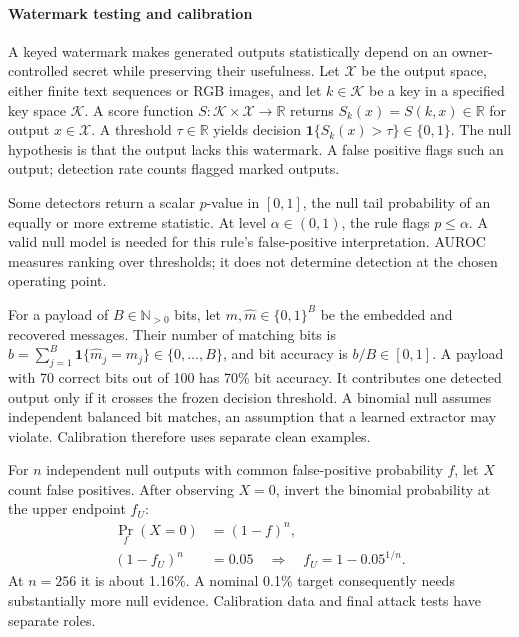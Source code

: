 \paragraph{Watermark testing and calibration}
A keyed watermark makes generated outputs statistically depend on an owner-controlled secret while preserving their usefulness. Let $\mathcal X$ be the output space, either finite text sequences or RGB images, and let $k\in\mathcal K$ be a key in a specified key space $\mathcal K$. A score function $S:\mathcal K\times\mathcal X\to\mathbb R$ returns $S_k(x)=S(k,x)\in\mathbb R$ for output $x\in\mathcal X$. A threshold $\tau\in\mathbb R$ yields decision $\mathbf1\{S_k(x)>\tau\}\in\{0,1\}$. The null hypothesis is that the output lacks this watermark. A false positive flags such an output; detection rate counts flagged marked outputs.

Some detectors return a scalar $p$-value in $[0,1]$, the null tail probability of an equally or more extreme statistic. At level $\alpha\in(0,1)$, the rule flags $p\leq\alpha$. A valid null model is needed for this rule's false-positive interpretation. AUROC measures ranking over thresholds; it does not determine detection at the chosen operating point.

For a payload of $B\in\mathbb N_{>0}$ bits, let $m,\widehat m\in\{0,1\}^B$ be the embedded and recovered messages. Their number of matching bits is $b=\sum_{j=1}^B\mathbf1\{\widehat m_j=m_j\}\in\{0,\ldots,B\}$, and bit accuracy is $b/B\in[0,1]$. A payload with 70 correct bits out of 100 has 70\% bit accuracy. It contributes one detected output only if it crosses the frozen decision threshold. A binomial null assumes independent balanced bit matches, an assumption that a learned extractor may violate. Calibration therefore uses separate clean examples.

For $n$ independent null outputs with common false-positive probability $f$, let $X$ count false positives. After observing $X=0$, invert the binomial probability at the upper endpoint $f_U$:
\begin{align}
 \Pr_f(X=0)&=(1-f)^n,\label{eq:null-zero-probability}\\
 (1-f_U)^n&=0.05
 \quad\Longrightarrow\quad f_U=1-0.05^{1/n}.
 \label{eq:null-zero-upper-bound}
\end{align} At $n=256$ it is about 1.16\%. A nominal 0.1\% target consequently needs substantially more null evidence. Calibration data and final attack tests have separate roles.
